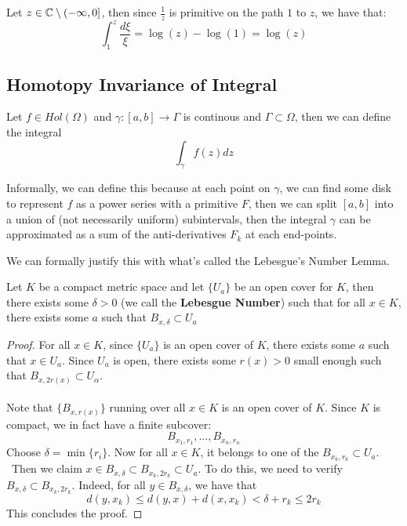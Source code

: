 \begin{remark}
Let $z \in \mathbb{C} \setminus (-\infty, 0]$, then since $\frac{1}{z}$ is primitive on the path $1$ to $z$, we have that:
\[\int_1^z \frac{d\xi}{\xi} = \log(z) - \log(1) = \log(z)\]
\end{remark}

\subsection{Homotopy Invariance of Integral}

Let $f \in Hol(\Omega)$ and $\gamma: [a, b] \to \Gamma$ is continous and $\Gamma \subset \Omega$, then we can define the integral
\[\int_\gamma f(z) dz\]

Informally, we can define this because at each point on $\gamma$, we can find some disk to represent $f$ as a power series with a primitive $F$, then we can split $[a, b]$ into a union of (not necessarily uniform) subintervals, then the integral $\gamma$ can be approximated as a sum of the anti-derivatives $F_k$ at each end-points.

We can formally justify this with what's called the Lebesgue's Number Lemma.

\begin{lemma}
Let $K$ be a compact metric space and let $\{U_a\}$ be an open cover for $K$, then there exists some $\delta > 0$ (we call the \textbf{Lebesgue Number}) such that for all $x \in K$, there exists some $a$ such that $B_{x, \delta} \subset U_a$
\end{lemma}

\begin{proof}
For all $x \in K$, since $\{U_a\}$ is an open cover of $K$, there exists some $a$ such that $x \in U_a$. Since $U_a$ is open, there exists some $r(x) > 0$ small enough such that $B_{x, 2r(x)} \subset U_\alpha$.\\\\
Note that $\{B_{x, r(x)}\}$ running over all $x \in K$ is an open cover of $K$. Since $K$ is compact, we in fact have a finite subcover:
\[B_{x_1, r_1}, ..., B_{x_n, r_n}\]
Choose $\delta = \min \{r_i\}$. Now for all $x \in K$, it belongs to one of the $B_{x_k, r_k} \subset U_a$.\\\
Then we claim $x \in B_{x, \delta} \subset B_{x_k, 2r_k} \subset U_a$. To do this, we need to verify $B_{x, \delta} \subset B_{x_k, 2r_k}$. Indeed, for all $y \in B_{x, \delta}$, we have that
\[d(y, x_k) \leq d(y, x) + d(x, x_k) < \delta + r_k \leq 2r_k\]
This concludes the proof.
\end{proof}


